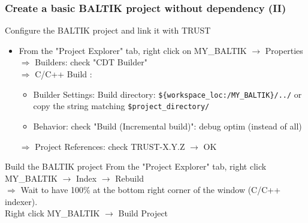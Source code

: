 \documentclass[10pt, hyperref={unicode=true,pdfusetitle, bookmarks=true,bookmarksnumbered=false,bookmarksopen=false, breaklinks=false,pdfborder={0 0 1},backref=true,colorlinks=true,linkcolor=darkblue,pageanchor, urlcolor=darkblue}]{beamer}
\begin{document}
\begin{frame}
\frametitle{Create a basic BALTIK project without dependency (II)}

\begin{exampleblock}{Configure the BALTIK project and link it with TRUST}
\begin{itemize}
\item From the "Project Explorer" tab, right click on MY\_BALTIK $\rightarrow$ Properties \\
  $\Rightarrow$ Builders: check "CDT Builder" \\
  $\Rightarrow$ C/C++ Build : 
  \begin{itemize}
  \item Builder Settings: Build directory: \texttt{\$\{workspace\_loc:/MY\_BALTIK\}/../} or copy the string matching \texttt{\$project\_directory/} \\
  \item Behavior: check "Build (Incremental build)": debug optim (instead of all) 
  \end{itemize}
  $\Rightarrow$ Project References: check TRUST-X.Y.Z $\rightarrow$ OK
\end{itemize}
\end{exampleblock}
  
\begin{exampleblock}{Build the BALTIK project}
From the "Project Explorer" tab, right click MY\_BALTIK $\rightarrow$ Index $\rightarrow$ Rebuild \\
  $\Rightarrow$ Wait to have 100\% at the bottom right corner of the window  (C/C++ indexer). \\
  Right click MY\_BALTIK $\rightarrow$ Build Project \\
\end{exampleblock}

\end{frame}
\end{document}
